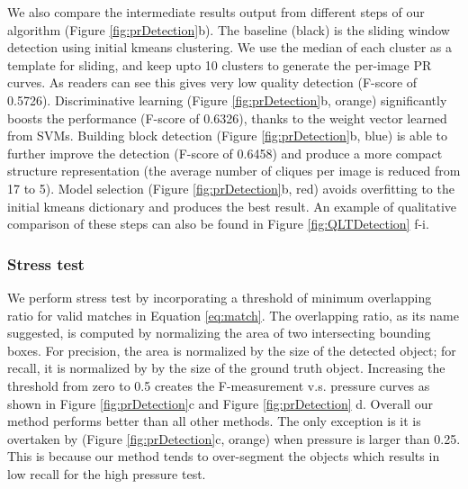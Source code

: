 \documentclass{acmtog}
\begin{document}
We also compare the intermediate results output from different steps of our algorithm (Figure \ref{fig:prDetection}b). The baseline (black) is the sliding window detection using initial kmeans clustering. We use the median of each cluster as a template for sliding, and keep upto 10 clusters to generate the per-image PR curves. As readers can see this gives very low quality detection (F-score of 0.5726). Discriminative learning (Figure \ref{fig:prDetection}b, orange) significantly boosts the performance (F-score of 0.6326), thanks to the weight vector learned from SVMs. Building block detection (Figure \ref{fig:prDetection}b, blue) is able to further improve the detection (F-score of 0.6458) and produce a more compact structure representation (the average number of cliques per image is reduced from 17 to 5). Model selection (Figure \ref{fig:prDetection}b, red) avoids overfitting to the initial kmeans dictionary and produces the best result. An example of qualitative comparison of these steps can also be found in Figure \ref{fig:QLTDetection} f-i.

\subsubsection{Stress test}

We perform stress test by incorporating a threshold of minimum overlapping ratio for valid matches in Equation \ref{eq:match}.  The overlapping ratio, as its name suggested, is computed by normalizing the area of two intersecting bounding boxes. For precision, the area is normalized by the size of the detected object; for recall, it is normalized by by the size of the ground truth object. Increasing the threshold from zero to 0.5 creates the F-measurement v.s. pressure curves as shown in Figure \ref{fig:prDetection}c and Figure \ref{fig:prDetection} d. Overall our method performs better than all other methods. The only exception is it is overtaken by \cite{Wu2010DL} (Figure \ref{fig:prDetection}c, orange) when pressure is larger than 0.25. This is because our method tends to over-segment the objects which results in low recall for the high pressure test. 
\end{document}
